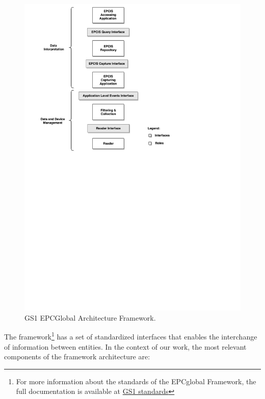\begin{figure}[ht!]
  \centering
  \includegraphics[width=.8\textwidth]{./images/EPCGlobal_architecture}
  \caption{GS1 EPCGlobal Architecture Framework.}
  \label{fig:epc_architecture}
\end{figure}

The framework\footnote{For more information about the standards of the EPCglobal Framework, the
full documentation is available at \href{http://www.gs1.org/gs1-architecture}{GS1 standards}} has a
set of standardized interfaces that enables the interchange of information between entities. In the
context of our work, the most relevant components of the framework architecture are:

